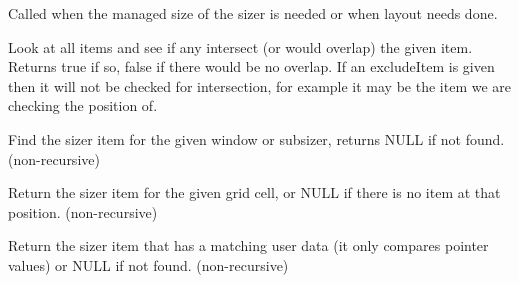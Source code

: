 
Called when the managed size of the sizer is needed or when layout
needs done.


\label{wxgridbagsizercheckforintersection}



Look at all items and see if any intersect (or would overlap) the given
item.  Returns true if so, false if there would be no overlap.  If an
excludeItem is given then it will not be checked for intersection, for
example it may be the item we are checking the position of.



\label{wxgridbagsizerfinditem}



Find the sizer item for the given window or subsizer, returns NULL if
not found. (non-recursive)



\label{wxgridbagsizerfinditematposition}


Return the sizer item for the given grid cell, or NULL if there is no
item at that position. (non-recursive)



\label{wxgridbagsizerfinditemwithdata}


Return the sizer item that has a matching user data (it only compares
pointer values) or NULL if not found. (non-recursive)



\label{wxgridbagsizergetemptycellsize}


